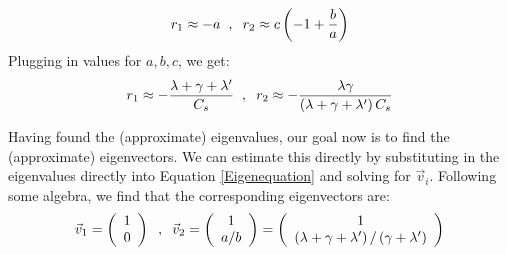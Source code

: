\begin{align*}
    r_1\approx-a\hspace{2mm},\hspace{2mm} r_2\approx c\left(-1 +\frac{b}{a}\right)
\end{align*}
Plugging in values for $a,b,c$, we get:
\begin{align*}
    r_1\approx-\frac{\lambda+\gamma+\lambda'}{C_s}\hspace{2mm},\hspace{2mm}
    r_2\approx-\frac{\lambda\gamma}{\left( \lambda+\gamma+\lambda' \right)C_s}
\end{align*}

Having found the (approximate) eigenvalues, our goal now is to find the (approximate) eigenvectors. We can estimate this directly by substituting in the eigenvalues directly into Equation \ref{Eigenequation} and solving for $\vec{v}_i$. Following some algebra, we find that the corresponding eigenvectors are:
\begin{align*}
    \vec{v}_1= \left( \begin{array}{c}
        1  \\
        0
    \end{array} \right)
    \hspace{2mm},\hspace{2mm}
    \vec{v}_2= \left( \begin{array}{c}
        1  \\
        a/b
    \end{array} \right)
    = \left( \begin{array}{c}
        1  \\
        \left( \lambda+\gamma+\lambda' \right)/\left(\gamma+\lambda' \right)
    \end{array} \right)
\end{align*}

